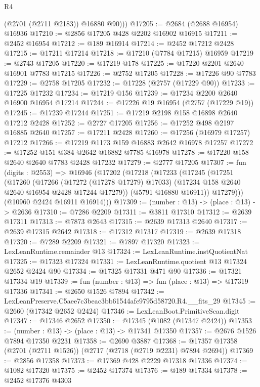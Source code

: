 \begin{lexlean}{R4}
\begin{coremodule}
          (@2701 (@2711 @2183))
          @16880
          @90)))
@17205 := @2684 (@2688 @16954) @16936
@17210 := @2856 @17205 @428 @2202 @16902 @16915
@17211 := @2452 @16954
@17212 := @189 @16914
@17214 := @2452 @17212 @2428
@17215 := @17211 @17214
@17218 := @17210 (@7784 @17215) @16959
@17219 := @2743 @17205
@17220 := @17219 @178
@17225 := @17220 @2201 @2640 @16901 @7783 @17215
@17226 := @2752 @17205
@17228 := @17226 @90 @7783
@17229 := @2758 @17205
@17232 := @17228 (@2757 (@17229 @90))
@17233 := @17225 @17232
@17234 := @17219 @156
@17239 := @17234 @2200 @2640 @16900 @16954 @17214
@17244 := @17226 @19 @16954 (@2757 (@17229 @19))
@17245 := @17239 @17244
@17251 := @17219 @2198 @158 @16898 @2640 @17212 @2428
@17252 := @2727 @17205
@17256 := @17252 @498 @2197 @16885 @2640
@17257 := @17211 @2428
@17260 := @17256 (@16979 @17257) @17212
@17266 := @17219 @1173 @159 @16883 @2642 @16978 @17257
@17272 := @17252 @151 @384 @2642 @16882 @7785 @16978
@17278 := @17220 @158 @2640 @2640 @7783 @2428 @17232
@17279 := @2777 @17205
@17307 := fun (digits : @2553) =>
  @16946
    (@17202
      (@17218
        (@17233
          (@17245
            (@17251
              (@17260
                (@17266
                  (@17272 (@17278 @17279) @17033)
                  (@17234 @158 @2640 @2640 @16954 @2428 @17244 @17279))
                (@5791 @16880 @16911))
              @17279)))
        (@10960 @2424 @16911 @16914)))
@17309 := (number : @13) -> (place : @13) -> @2636
@17310 := @7286 @2209
@17311 := @3811 @17310
@17312 := @2639 @17311
@17313 := @7873 @2643
@17315 := @2639 @17313 @2640
@17317 := @2639 @17315 @2642
@17318 := @17312 @17317
@17319 := @2639 @17318
@17320 := @7289 @2209
@17321 := @7897 @17320
@17323 := LexLeanRuntime.remainder @13
@17324 := LexLeanRuntime.instQuotientNat
@17325 := @17323 @17324
@17331 := LexLeanRuntime.quotient @13 @17324 @2652 @2424 @90
@17334 := @17325 @17331 @471 @90
@17336 := @17321 @17334 @19
@17339 := fun (number : @13) => fun (place : @13) => @17319 @17336
@17341 := @2650 @1526 @7894
@17342 := LexLeanPreserve.C5aee7c3beac3bb61544afe9795d58720.R4.__fits_29
@17345 := @2660 (@17342 @2652 @2424)
@17346 := LexLeanBoot.PrimitiveScan.digit
@17347 := @17346 @2652
@17350 := @17345 (@1082 (@17347 @2424))
@17353 := (number : @13) -> (place : @13) -> @17341 @17350
@17357 := @2676 @1526 @7894 @17350 @2231
@17358 := @2690 @3887
@17368 := @17357 @17358 (@2701 (@2711 @1526)) (@2717 (@2718 (@2719 @2231) @7894 @2694))
@17369 := @2856 @17358
@17373 := @17369 @428 @2229 @17318 @17336
@17374 := @1082 @17320
@17375 := @2452 @17374
@17376 := @189 @17334
@17378 := @2452 @17376 @4303

\end{coremodule}
\end{lexlean}
